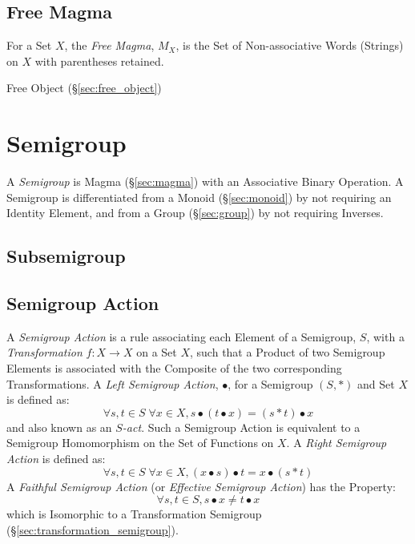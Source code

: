\subsection{Free Magma}\label{sec:free_magma}

For a Set $X$, the \emph{Free Magma}, $M_X$, is the Set of
Non-associative Words (Strings) on $X$ with parentheses retained.

Free Object (\S\ref{sec:free_object})



\section{Semigroup}\label{sec:semigroup}

A \emph{Semigroup} is Magma (\S\ref{sec:magma}) with an Associative
Binary Operation. A Semigroup is differentiated from a Monoid
(\S\ref{sec:monoid}) by not requiring an Identity Element, and from
a Group (\S\ref{sec:group}) by not requiring Inverses.



\subsection{Subsemigroup}\label{sec:subsemigroup}

\subsection{Semigroup Action}\label{sec:semigroup_action}

A \emph{Semigroup Action} is a rule associating each Element of a
Semigroup, $S$, with a \emph{Transformation} $f : X \rightarrow X$ on
a Set $X$, such that a Product of two Semigroup Elements is associated
with the Composite of the two corresponding Transformations. A
\emph{Left Semigroup Action}, $\bullet$, for a Semigroup $(S,*)$ and
Set $X$ is defined as:
\[
  \forall s,t \in S\;\forall x \in X, s \bullet (t \bullet x) = (s * t)
  \bullet x
\]
and also known as an \emph{$S$-act}. Such a Semigroup Action is
equivalent to a Semigroup Homomorphism on the Set of Functions on $X$.
A \emph{Right Semigroup Action} is defined as:
\[
  \forall s,t \in S\;\forall x \in X, (x \bullet s) \bullet t = x
  \bullet (s * t)
\]
A \emph{Faithful Semigroup Action} (or \emph{Effective Semigroup
  Action}) has the Property:
\[
  \forall s, t \in S, s \bullet x \neq t \bullet x
\]
which is Isomorphic to a Transformation Semigroup
(\S\ref{sec:transformation_semigroup}).



